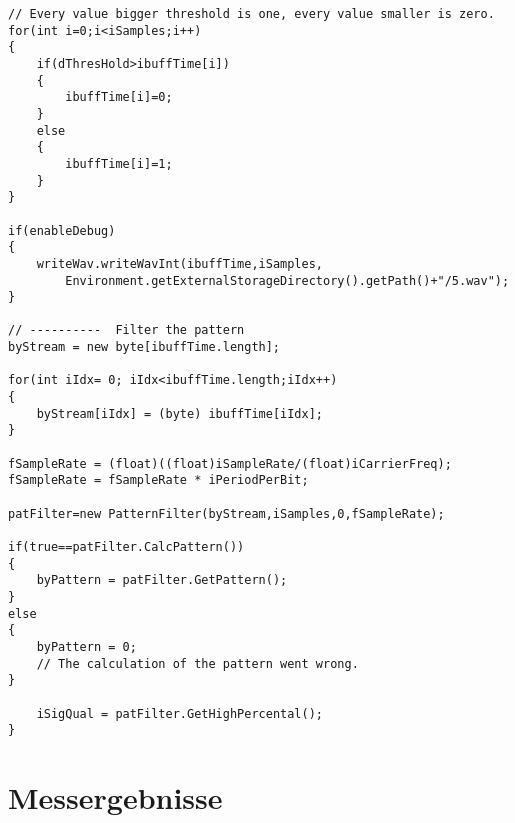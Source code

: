 \documentclass[10pt]{article}
\begin{document}
\begin{lstlisting}
// Every value bigger threshold is one, every value smaller is zero.
for(int i=0;i<iSamples;i++)
{
	if(dThresHold>ibuffTime[i])
	{
		ibuffTime[i]=0;
	}
	else
	{
		ibuffTime[i]=1;
	}	
}
		
if(enableDebug)
{
	writeWav.writeWavInt(ibuffTime,iSamples,
		Environment.getExternalStorageDirectory().getPath()+"/5.wav");
}
		
// ----------  Filter the pattern
byStream = new byte[ibuffTime.length]; 
		
for(int iIdx= 0; iIdx<ibuffTime.length;iIdx++)
{
	byStream[iIdx] = (byte) ibuffTime[iIdx];
}
		
fSampleRate = (float)((float)iSampleRate/(float)iCarrierFreq);
fSampleRate = fSampleRate * iPeriodPerBit; 
		
patFilter=new PatternFilter(byStream,iSamples,0,fSampleRate);
		
if(true==patFilter.CalcPattern())
{
	byPattern = patFilter.GetPattern();	
}
else
{
	byPattern = 0;
	// The calculation of the pattern went wrong.
}
		
	iSigQual = patFilter.GetHighPercental();
}

\end{lstlisting} 



\part{Messergebnisse}
\end{document}
